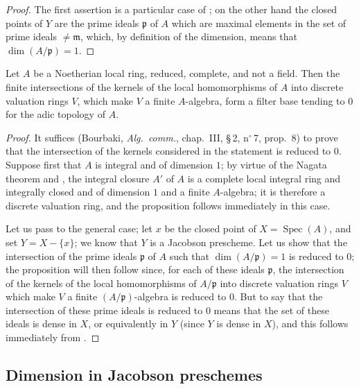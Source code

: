 \begin{proof}
The first assertion is a particular case of ; on the other hand the closed points of $Y$ are the prime ideals $\mathfrak{p}$ of $A$ which are maximal elements in the set of prime ideals $\neq\mathfrak{m}$, which, by definition of the dimension, means that $\dim(A/\mathfrak{p})=1$.
\end{proof}

\begin{proposition}[10.5.10]
\label{IV.10.5.10}
Let $A$ be a Noetherian local ring, reduced, complete, and not a field.
Then the finite intersections of the kernels of the local homomorphisms of $A$ into discrete valuation rings $V$, which make $V$ a finite $A$-algebra, form a filter base tending to $0$ for the adic topology of $A$.
\end{proposition}

\begin{proof}
It suffices (Bourbaki, \emph{Alg.\ comm.}, chap.~III, \S\,2, n$^\circ$\,7, prop.~8) to prove that the intersection of the kernels considered in the statement is reduced to $0$.
Suppose first that $A$ is integral and of dimension $1$; by virtue of the Nagata theorem  and , the integral closure $A'$ of $A$ is a complete local integral ring and
integrally closed and of dimension $1$ and a finite $A$-algebra; it is therefore a discrete valuation ring, and the proposition follows immediately in this case.

Let us pass to the general case; let $x$ be the closed point of $X=\operatorname{Spec}(A)$, and set $Y=X-\{x\}$; we know  that $Y$ is a Jacobson prescheme.
Let us show that the intersection of the prime ideals $\mathfrak{p}$ of $A$ such that $\dim(A/\mathfrak{p})=1$ is reduced to $0$; the proposition will then follow since, for each of these ideals $\mathfrak{p}$, the intersection of the kernels of the local homomorphisms of $A/\mathfrak{p}$ into discrete valuation rings $V$ which make $V$ a finite $(A/\mathfrak{p})$-algebra is reduced to $0$.
But to say that the intersection of these prime ideals is reduced to $0$ means that the set of these ideals is dense in $X$, or equivalently in $Y$ (since $Y$ is dense in $X$), and this follows immediately from .
\end{proof}

\subsection{Dimension in Jacobson preschemes}
\label{subsection:IV.10.6}

